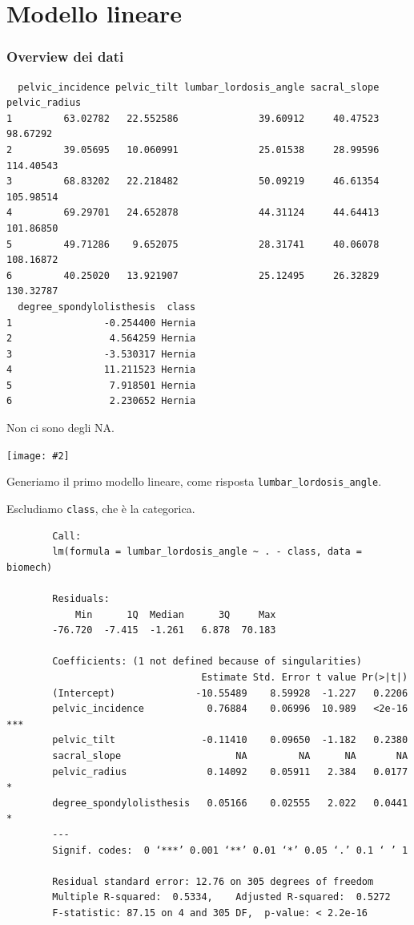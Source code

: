 \documentclass{beamer}
\newcommand{\fg}[2]{%
  \begin{center}
      \texttt{[image: \#2]}%
  \end{center}
}
\begin{document}
\section{Modello lineare}
\begin{frame}[fragile]
\frametitle{Overview dei dati}
\tiny
	\begin{verbatim}
  pelvic_incidence pelvic_tilt lumbar_lordosis_angle sacral_slope pelvic_radius
1         63.02782   22.552586              39.60912     40.47523      98.67292
2         39.05695   10.060991              25.01538     28.99596     114.40543
3         68.83202   22.218482              50.09219     46.61354     105.98514
4         69.29701   24.652878              44.31124     44.64413     101.86850
5         49.71286    9.652075              28.31741     40.06078     108.16872
6         40.25020   13.921907              25.12495     26.32829     130.32787
  degree_spondylolisthesis  class
1                -0.254400 Hernia
2                 4.564259 Hernia
3                -3.530317 Hernia
4                11.211523 Hernia
5                 7.918501 Hernia
6                 2.230652 Hernia
	\end{verbatim}

	{\normalsize Non ci sono degli NA.}
\end{frame}



\begin{frame}
	\fg{1}{00ggpairs}
\end{frame}



\begin{frame}[fragile]
	Generiamo il primo modello lineare, come risposta \texttt{lumbar\_lordosis\_angle}.
	
	Escludiamo \texttt{class}, che è la categorica.

	{\tiny
	\begin{verbatim}
		Call:
		lm(formula = lumbar_lordosis_angle ~ . - class, data = biomech)

		Residuals:
		    Min      1Q  Median      3Q     Max 
		-76.720  -7.415  -1.261   6.878  70.183 

		Coefficients: (1 not defined because of singularities)
		                          Estimate Std. Error t value Pr(>|t|)    
		(Intercept)              -10.55489    8.59928  -1.227   0.2206    
		pelvic_incidence           0.76884    0.06996  10.989   <2e-16 ***
		pelvic_tilt               -0.11410    0.09650  -1.182   0.2380    
		sacral_slope                    NA         NA      NA       NA    
		pelvic_radius              0.14092    0.05911   2.384   0.0177 *  
		degree_spondylolisthesis   0.05166    0.02555   2.022   0.0441 *  
		---
		Signif. codes:  0 ‘***’ 0.001 ‘**’ 0.01 ‘*’ 0.05 ‘.’ 0.1 ‘ ’ 1

		Residual standard error: 12.76 on 305 degrees of freedom
		Multiple R-squared:  0.5334,	Adjusted R-squared:  0.5272 
		F-statistic: 87.15 on 4 and 305 DF,  p-value: < 2.2e-16

	\end{verbatim}
	}
\end{frame}
\end{document}
